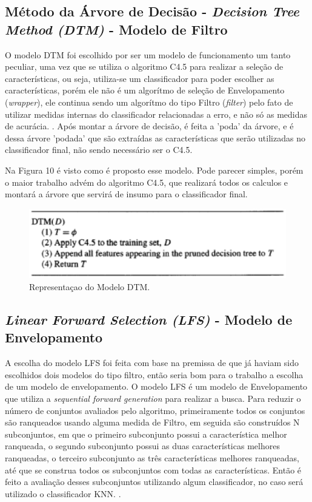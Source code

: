 \subsection{Método da Árvore de Decisão - \textit{Decision Tree Method (DTM)} - Modelo de Filtro}

O modelo DTM foi escolhido por ser um modelo de funcionamento um tanto peculiar, uma vez que se utiliza o algoritmo C4.5 para realizar a seleção de características, ou seja, utiliza-se um classificador para poder escolher as características, porém ele não é um algorítmo de seleção de Envelopamento (\textit{wrapper}), ele continua sendo um algorítmo do tipo Filtro (\textit{filter}) pelo fato de utilizar medidas internas do classificador relacionadas a erro, e não só as medidas de acurácia. \cite{dash_1997}. Após montar a árvore de decisão, é feita a 'poda' da árvore, e é dessa árvore 'podada' que são extraídas as características que serão utilizadas no classificador final, não sendo necessário ser o C4.5. 

Na Figura 10 é visto como é proposto esse modelo. Pode parecer simples, porém o maior trabalho advém do algoritmo C4.5, que realizará todos os calculos e montará a árvore que servirá de insumo para o classificador final.

\begin{figure}[h]
	\centering
	\label{fig12}
		\includegraphics[keepaspectratio=true,scale=0.7]{figuras/fig12.eps}
	\caption{Representaçao do Modelo DTM. \cite{dash_1997}}
\end{figure}

\subsection{\textit{Linear Forward Selection (LFS)} - Modelo de Envelopamento}

A escolha do modelo LFS foi feita com base na premissa de que já haviam sido escolhidos dois modelos do tipo filtro, então seria bom para o trabalho a escolha de um modelo de envelopamento. O modelo LFS é um modelo de Envelopamento que utiliza a \textit{sequential forward generation} para realizar a busca. Para reduzir o número de conjuntos avaliados pelo algoritmo, primeiramente todos os conjuntos são ranqueados usando alguma medida de Filtro, em seguida são construídos N subconjuntos, em que o primeiro subconjunto possui a característica melhor ranqueada, o segundo subconjunto possui as duas características melhores ranqueadas, o terceiro subconjunto as três características melhores ranqueadas, até que se construa todos os subconjuntos com todas as características. Então é feito a avaliação desses subconjuntos utilizando algum classificador, no caso será utilizado o classificador KNN. \cite{gutlein_2009}.

